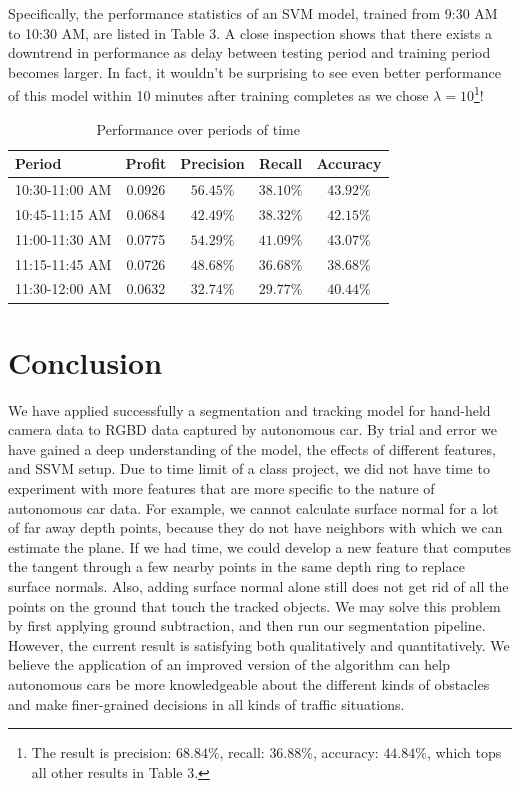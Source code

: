 \documentclass[10pt,twocolumn,letterpaper]{article}
\begin{document}
Specifically, the performance statistics of an SVM model, trained from 9:30 AM to 10:30 AM, are listed in Table 3. A close inspection shows that there exists a downtrend in performance as delay between testing period and training period becomes larger. In fact, it wouldn't be surprising to see even better performance of this model within 10 minutes after training completes as we chose $\lambda=10$\footnote{The result is precision: $68.84\%$, recall: $36.88\%$, accuracy: $44.84\%$, which tops all other results in Table 3.}!

\begin{table}[H]
\centering
\caption{Performance over periods of time}
\begin{tabular}{ p{2cm}|c|c|c|c }
 Period  & Profit & Precision & Recall & Accuracy \\
\hline
\hline
10:30-11:00 AM &    0.0926     &   $56.45\%$   & $38.10\%$   & $43.92\%$  \\
\hline
10:45-11:15 AM &    0.0684     &   $42.49\%$   & $38.32\%$   &  $42.15\%$ \\
\hline
11:00-11:30 AM &    0.0775     &   $54.29\%$   & $41.09\%$   &  $43.07\%$ \\
\hline
11:15-11:45 AM &    0.0726     &   $48.68\%$   & $36.68\%$   &  $38.68\%$ \\
\hline
11:30-12:00 AM &    0.0632     &   $32.74\%$   & $29.77\%$   &  $40.44\%$ \\
\hline
\end{tabular}
\end{table}

\section{Conclusion}
We have applied successfully a segmentation and tracking model for hand-held
camera data to RGBD data captured by autonomous car.
By trial and error we have gained a deep understanding of the model, 
the effects of different features, and SSVM setup. Due to time limit of a class
project, we did not have time to experiment with more features that are more
specific to the nature of autonomous car data. For example,
we cannot calculate surface normal for a lot of far away depth points, because
they do not have neighbors with which we can estimate the plane. If we had
time, we could 
develop a new feature that computes the tangent through a few nearby points
in the same depth ring to replace surface normals. Also, adding surface normal alone still does not get rid of all the points on the ground that touch the tracked objects. We may solve this problem by first applying ground subtraction, and then run our segmentation pipeline.
 However, the current result is satisfying both qualitatively and quantitatively.
 We believe the application of an improved version of the algorithm can help
 autonomous cars be more knowledgeable about the different kinds of obstacles 
 and make finer-grained decisions in all kinds of traffic situations.
\end{document}
